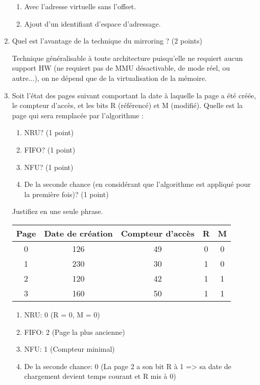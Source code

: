 \begin{enumerate}
\begin{correction}
\begin{enumerate}[label=(\alph*)]
\item Avec l'adresse virtuelle sans l'offset.
\item Ajout d'un identifiant d'espace d'adressage.
\end{enumerate}
\end{correction}

\item Quel est l'avantage de la technique du mirroring ? (2 points)

\begin{correction}
Technique généralisable à toute architecture puisqu'elle ne requiert aucun support HW (ne requiert pas de MMU désactivable, de mode réel, ou autre...), on ne dépend que de la virtualisation de la mémoire.
\end{correction}

\item Soit l'état des pages suivant comportant la date à laquelle la page a été créée, le compteur d'accès, et les bits R (référencé) et M (modifié). Quelle est la page qui sera remplacée par l'algorithme :
\begin{enumerate}
  \item NRU? (1 point)
  \item FIFO? (1 point)
  \item NFU? (1 point)
  \item De la seconde chance (en considérant que l'algorithme est appliqué pour la première fois)? (1 point)
\end{enumerate}
Justifiez en une seule phrase.

\begin{center}
\begin{tabular}{|c|c|c|c|c|}
\hline
Page & Date de création & Compteur d'accès & R & M\tabularnewline
\hline
\hline
0 & 126 & 49 & 0 & 0\tabularnewline
\hline
1 & 230 & 30 & 1 & 0\tabularnewline
\hline
2 & 120 & 42 & 1 & 1\tabularnewline
\hline
3 & 160 & 50 & 1 & 1\tabularnewline
\hline
\end{tabular}
\end{center}

\begin{correction}
\begin{enumerate}[label=(\alph*)]
  \item NRU: 0 (R = 0, M = 0)
  \item FIFO: 2 (Page la plus ancienne)
  \item NFU: 1 (Compteur minimal)
  \item De la seconde chance: 0 (La page 2 a son bit R à 1 => sa date de chargement devient temps courant et R mis à 0)
\end{enumerate}
\end{correction}

\end{enumerate}


